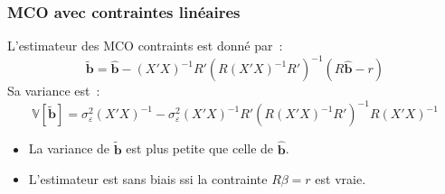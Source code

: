\documentclass[10pt]{beamer}
\theoremstyle{plain}
\begin{document}
\begin{frame}
  \frametitle{MCO avec contraintes linéaires}

  \begin{theorem}\label{thm:constrained_ols}
    L'estimateur des MCO contraints est donné par~:
    \[
      \tilde{\mathbf b} = \hat{\mathbf b} - (X'X)^{-1}R'\left( R(X'X)^{-1}R' \right)^{-1}\left( R\hat{\mathbf b}-r \right)
    \]
    Sa variance est~:
    \[
      \mathbb V\left[ \tilde{\mathbf b} \right] = \sigma_{\varepsilon}^2(X'X)^{-1} - \sigma_{\varepsilon}^2(X'X)^{-1}R'\left( R(X'X)^{-1}R' \right)^{-1}R(X'X)^{-1}
    \]
  \end{theorem}

  \bigskip

  \begin{itemize}

  \item La variance de $\tilde{\mathbf b}$ est plus petite que celle de $\hat{\mathbf b}$.\newline

  \item L'estimateur est sans biais ssi la contrainte $R\beta = r$ est vraie.

  \end{itemize}

\end{frame}
\end{document}

